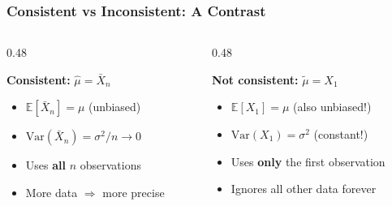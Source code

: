 \documentclass[aspectratio=169]{beamer}
\begin{document}
\begin{frame}
\frametitle{Consistent vs Inconsistent: A Contrast}

\small
\begin{columns}[T]
\begin{column}{0.48\textwidth}
\begin{center}
\textcolor{paramgreen}{\textbf{Consistent:}} $\hat\mu = \bar{X}_n$
\end{center}
\begin{itemize}\setlength{\itemsep}{2pt}
  \item $\mathbb{E}[\bar{X}_n] = \mu$ \;(unbiased)
  \item $\text{Var}(\bar{X}_n) = \sigma^2/n \to 0$
  \item Uses \textbf{all} $n$ observations
  \item More data $\Rightarrow$ more precise
\end{itemize}
\end{column}
\begin{column}{0.48\textwidth}
\begin{center}
\textcolor{sampred}{\textbf{Not consistent:}} $\tilde\mu = X_1$
\end{center}
\begin{itemize}\setlength{\itemsep}{2pt}
  \item $\mathbb{E}[X_1] = \mu$ \;(also unbiased!)
  \item $\text{Var}(X_1) = \sigma^2$ \;(constant!)
  \item Uses \textbf{only} the first observation
  \item Ignores all other data forever
\end{itemize}
\end{column}
\end{columns}

\vspace{0.3cm}
\begin{center}
\end{center}
\end{frame}
\end{document}
